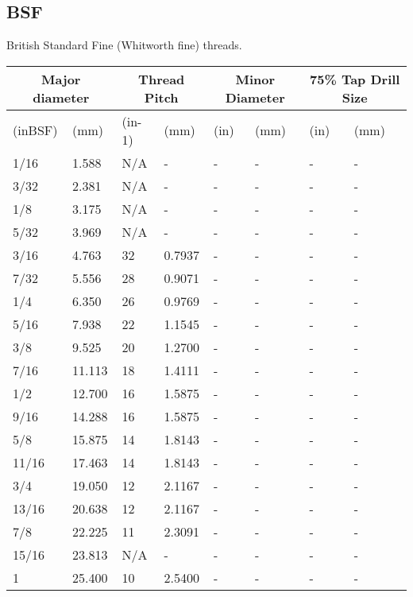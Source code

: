 \subsection{BSF}
British Standard Fine (Whitworth fine) threads.
\begin{table}[h!]
    \footnotesize
\begin{longtable}{ll|ll|llll}
\multicolumn{2}{c}{ Major diameter}
	&\multicolumn{2}{c}{Thread Pitch}
	&\multicolumn{2}{c}{Minor Diameter}
	&\multicolumn{2}{c}{75\% Tap Drill Size}
	\\

\hline
(inBSF)  &(mm) &(in-1) &(mm)   &(in) &(mm) &(in) &(mm)\\
\hline
1/16  &1.588   &N/A    &-      &-      &-     &-    &-    \\
3/32  &2.381   &N/A    &-      &-      &-     &-    &-    \\
1/8   &3.175   &N/A    &-      &-      &-     &-    &-    \\
5/32  &3.969   &N/A    &-      &-      &-     &-    &-    \\
3/16  &4.763   &32     &0.7937 &-      &-     &-    &-    \\
7/32  &5.556   &28     &0.9071 &-      &-     &-    &-    \\
1/4   &6.350   &26     &0.9769 &-      &-     &-    &-    \\
5/16  &7.938   &22     &1.1545 &-      &-     &-    &-    \\
3/8   &9.525   &20     &1.2700 &-      &-     &-    &-    \\
7/16  &11.113  &18     &1.4111 &-      &-     &-    &-    \\
1/2   &12.700  &16     &1.5875 &-      &-     &-    &-    \\
9/16  &14.288  &16     &1.5875 &-      &-     &-    &-    \\
5/8   &15.875  &14     &1.8143 &-      &-     &-    &-    \\
11/16 &17.463  &14     &1.8143 &-      &-     &-    &-    \\
3/4   &19.050  &12     &2.1167 &-      &-     &-    &-    \\
13/16 &20.638  &12     &2.1167 &-      &-     &-    &-    \\
7/8   &22.225  &11     &2.3091 &-      &-     &-    &-    \\
15/16 &23.813  &N/A    &-      &-      &-     &-    &-    \\
1     &25.400  &10     &2.5400 &-      &-     &-    &-    \\

\end{longtable}
\end{table}
